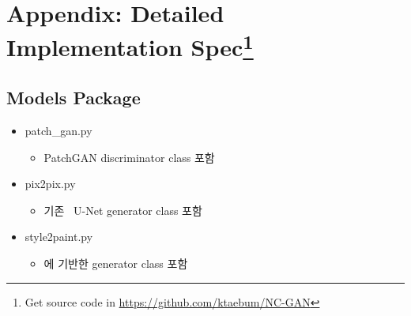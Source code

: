 \section*{Appendix: Detailed Implementation Spec\footnote{Get source code in \url{https://github.com/ktaebum/NC-GAN}}}
\label{sec:appendix}

\subsection*{Models Package}

\begin{itemize}
	\item patch\_gan.py
	\begin{itemize}
		\item PatchGAN discriminator class 포함
	\end{itemize}
	\item pix2pix.py
	\begin{itemize}
		\item 기존 \pixpix~U-Net generator class 포함
	\end{itemize}
	\item style2paint.py
	\begin{itemize}
		\item \stylepaint 에 기반한 generator class 포함
	\end{itemize}
\end{itemize}

